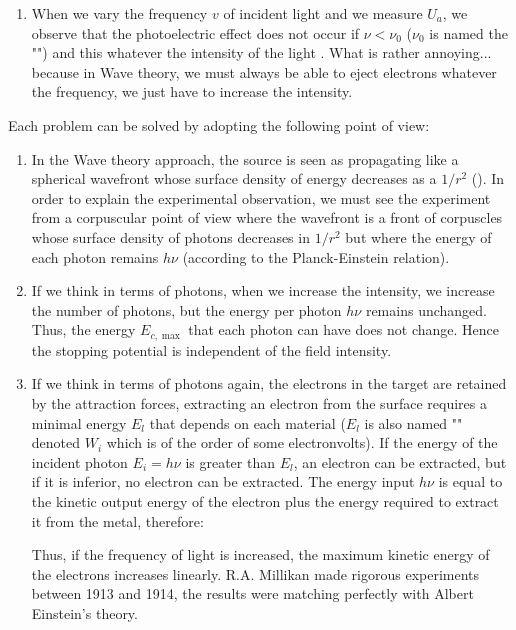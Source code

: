 \begin{enumerate}
		\item When we vary the frequency $v$ of incident light and we measure $U_a$, we observe that the photoelectric effect does not occur if $\nu<\nu_0$ ($\nu_0$ is named the "") and this whatever the intensity of the light . What is rather annoying... because in Wave theory, we must always be able to eject electrons whatever the frequency, we just have to increase the intensity.
	\end{enumerate}
	Each problem can be solved by adopting the following point of view:
	\begin{enumerate}
		\item In the Wave theory approach, the source is seen as propagating like a spherical wavefront whose surface density of energy decreases as a $1/r^2$ (). In order to explain the experimental observation, we must see the experiment from a corpuscular point of view where the wavefront is a front of corpuscles whose surface density of photons decreases in $1/r^2$ but where the energy of each photon remains $h\nu$ (according to the Planck-Einstein relation).
		
		\item If we think in terms of photons, when we increase the intensity, we increase the number of photons, but the energy per photon $h\nu$ remains unchanged. Thus, the energy $E_{c,\max}$ that each photon can have does not change. Hence the stopping potential is independent of the field intensity.
		
		\item If we think in terms of photons again, the electrons in the target are retained by the attraction forces, extracting an electron from the surface requires a minimal energy $E_l$ that depends on each material ($E_l$ is also named "" denoted $W_i$ which is of the order of some electronvolts). If the energy of the incident photon $E_i=h\nu$ is greater than $E_l$, an electron can be extracted, but if it is inferior, no electron can be extracted. The energy input $h\nu$ is equal to the kinetic output energy of the electron plus the energy required to extract it from the metal, therefore:
		
		Thus, if the frequency of light is increased, the maximum kinetic energy of the electrons increases linearly. R.A. Millikan made rigorous experiments between 1913 and 1914, the results were matching perfectly with Albert Einstein's theory.
	\end{enumerate}
